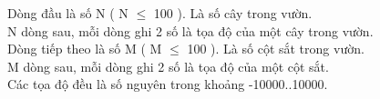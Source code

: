 Dòng đầu là số N ( N  $\le$  100 ). Là số cây trong vườn.   
\\   N dòng sau, mỗi dòng ghi 2 số là tọa độ của một cây trong vườn.   
\\   Dòng tiếp theo là số M ( M  $\le$  100 ). Là số cột sắt trong vườn.   
\\   M dòng sau, mỗi dòng ghi 2 số là tọa độ của một cột sắt.   
\\   Các tọa độ đều là số nguyên trong khoảng -10000..10000.